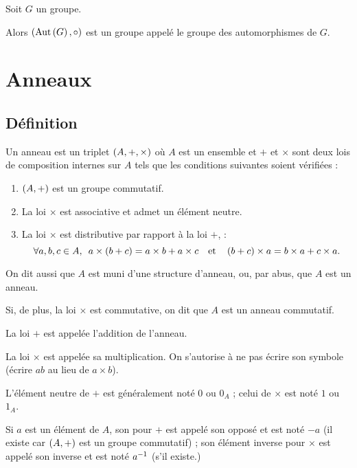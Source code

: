 \begin{ex}
Soit \(G\) un groupe.

Alors \(\groupe{\Aut{G}}[\rond]\) est un groupe appelé le groupe des automorphismes de \(G\).
\end{ex}

\begin{dem}
\end{dem}

\section{Anneaux}

\subsection{Définition}

\begin{defi}[Anneau]
Un anneau est un triplet \(\anneau{A}\) où \(A\) est un ensemble et \(+\) et \(\times\) sont deux lois de composition internes sur \(A\) tels que les conditions suivantes soient vérifiées :

\begin{enumerate}
\item \(\groupe{A}\) est un groupe commutatif. \\

\item La loi \(\times\) est associative et admet un élément neutre. \\

\item La loi \(\times\) est distributive par rapport à la loi \(+\), \cad : \[\quantifs{\forall a,b,c\in A}a\times\paren{b+c}=a\times b+a\times c\quad\text{et}\quad\paren{b+c}\times a=b\times a+c\times a.\]
\end{enumerate}

On dit aussi que \(A\) est muni d'une structure d'anneau, ou, par abus, que \(A\) est un anneau.

Si, de plus, la loi \(\times\) est commutative, on dit que \(A\) est un anneau commutatif.
\end{defi}

\begin{rem}
La loi \(+\) est appelée l'addition de l'anneau.

La loi \(\times\) est appelée sa multiplication. On s'autorise à ne pas écrire son symbole (\cad écrire \(ab\) au lieu de \(a\times b\)).

L'élément neutre de \(+\) est généralement noté \(0\) ou \(0_A\) ; celui de \(\times\) est noté \(1\) ou \(1_A\).

Si \(a\) est un élément de \(A\), son  pour \(+\) est appelé son opposé et est noté \(-a\) (il existe car \(\groupe{A}\) est un groupe commutatif) ; son élément inverse pour \(\times\) est appelé son inverse et est noté \(a^{-1}\) (s'il existe.)
\end{rem}

